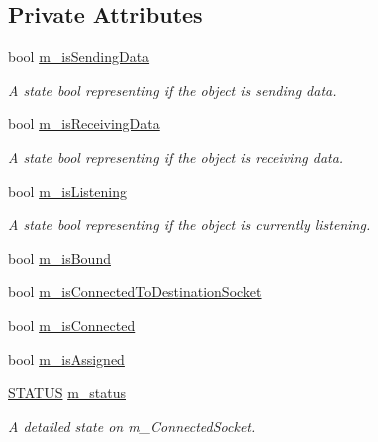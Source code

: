 \subsection*{Private Attributes}
\begin{DoxyCompactItemize}
\item 
bool \hyperlink{class_communication_1_1_connection_status_aeb89ad295c5f513ee4388a6e8fe8b997}{m\+\_\+is\+Sending\+Data}
\begin{DoxyCompactList}\small\item\em A state bool representing if the object is sending data. \end{DoxyCompactList}\item 
bool \hyperlink{class_communication_1_1_connection_status_a4c8edb70feb123e6a5e6cd75ddcdd468}{m\+\_\+is\+Receiving\+Data}
\begin{DoxyCompactList}\small\item\em A state bool representing if the object is receiving data. \end{DoxyCompactList}\item 
bool \hyperlink{class_communication_1_1_connection_status_af805eedc14d916294b7ef4ec70e8b24b}{m\+\_\+is\+Listening}
\begin{DoxyCompactList}\small\item\em A state bool representing if the object is currently listening. \end{DoxyCompactList}\item 
bool \hyperlink{class_communication_1_1_connection_status_ae89ece76fe699c7d1f943ec4bf5abfd9}{m\+\_\+is\+Bound}
\item 
bool \hyperlink{class_communication_1_1_connection_status_a75682bfd7179c2de4e54b15f3080cc73}{m\+\_\+is\+Connected\+To\+Destination\+Socket}
\item 
bool \hyperlink{class_communication_1_1_connection_status_a3dd4daaa2236535df54db8d755e2e6dc}{m\+\_\+is\+Connected}
\item 
bool \hyperlink{class_communication_1_1_connection_status_af8eda66a74967c2e5226203d09d0b1cb}{m\+\_\+is\+Assigned}
\item 
\hyperlink{namespace_communication_a8dc059cf785da5e0d245141c4f8a6a9c}{S\+T\+A\+T\+U\+S} \hyperlink{class_communication_1_1_connection_status_a91fdffcdf89271aec6f7943e44776cc9}{m\+\_\+status}
\begin{DoxyCompactList}\small\item\em A detailed state on m\+\_\+\+Connected\+Socket. \end{DoxyCompactList}\end{DoxyCompactItemize}
